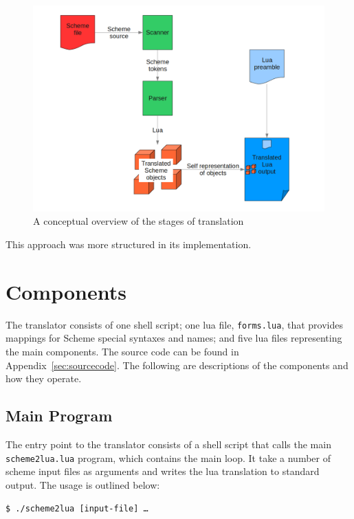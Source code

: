 \begin{figure}
\centering
\includegraphics[width=\textwidth]{overview.png}
\caption{A conceptual overview of the stages of translation}
\label{fig:overview}
\end{figure}

This approach was more structured in its implementation.


\section{Components}

The translator consists of one shell script; one lua file, \texttt{forms.lua},
that provides mappings for Scheme special syntaxes and names; and five lua files
representing the main components. The source code can be found in
Appendix~\ref{sec:sourcecode}. The following are descriptions of the components
and how they operate.

\subsection{Main Program}

The entry point to the translator consists of a shell script that calls the main
\texttt{scheme2lua.lua} program, which contains the main loop. It take a number
of scheme input files as arguments and writes the lua translation to standard
output. The usage is outlined below:

\begin{framed}
\texttt{\$ ./scheme2lua [input-file] \ldots}
\end{framed}

